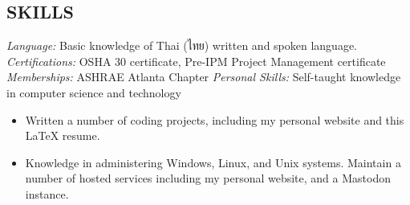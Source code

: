\documentclass[margin]{res}
\begin{document}
\begin{resume}
\section{SKILLS}
    {\sl Language:} Basic knowledge of Thai (ไทย) written and spoken language. \\
    {\sl Certifications:} OSHA 30 certificate, Pre-IPM Project Management certificate
    {\sl Memberships:} ASHRAE Atlanta Chapter
    {\sl Personal Skills:} Self-taught knowledge in computer science and technology
    \begin{itemize} \itemsep -2pt
    \item Written a number of coding projects, including my personal website and this \LaTeX{} resume. 
    \item Knowledge in administering Windows, Linux, and Unix systems. Maintain a number of hosted services including my personal website, and a Mastodon instance.
    \end{itemize}

\end{resume}
\end{document}

